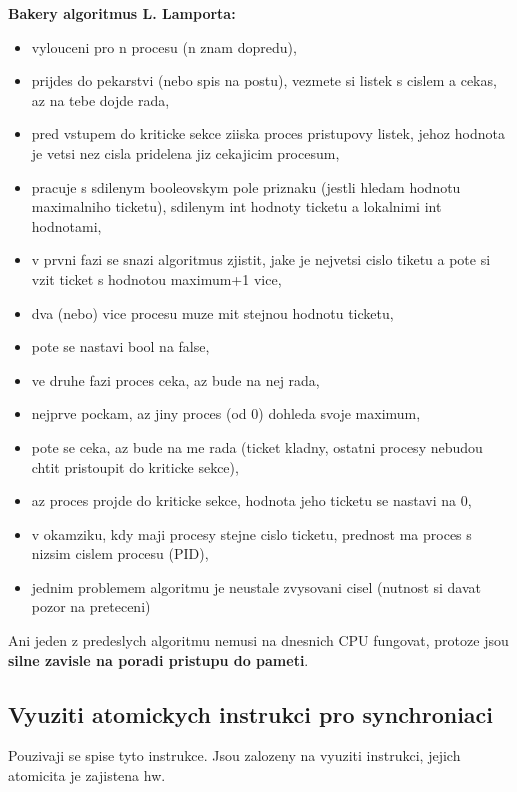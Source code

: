 \documentclass[a4paper, 11pt]{article}
\begin{document}
\textbf{Bakery algoritmus L. Lamporta:}
\begin{itemize}
    \item vylouceni pro n procesu (n znam dopredu),
    \item prijdes do pekarstvi (nebo spis na postu), vezmete si listek s cislem a cekas, az na tebe dojde rada,
    \item pred vstupem do kriticke sekce ziiska proces pristupovy listek, jehoz hodnota je vetsi nez cisla pridelena jiz cekajicim procesum,
    \item pracuje s sdilenym booleovskym pole priznaku (jestli hledam hodnotu maximalniho ticketu), sdilenym int hodnoty ticketu a lokalnimi int hodnotami,
    \item v prvni fazi se snazi algoritmus zjistit, jake je nejvetsi cislo tiketu a pote si vzit ticket s hodnotou maximum+1 vice,
    \item dva (nebo) vice procesu muze mit stejnou hodnotu ticketu,
    \item pote se nastavi bool na false,
    \item ve druhe fazi proces ceka, az bude na nej rada,
    \item nejprve pockam, az jiny proces (od 0) dohleda svoje maximum,
    \item pote se ceka, az bude na me rada (ticket kladny, ostatni procesy nebudou chtit pristoupit do kriticke sekce),
    \item az proces projde do kriticke sekce, hodnota jeho ticketu se nastavi na 0,
    \item v okamziku, kdy maji procesy stejne cislo ticketu, prednost ma proces s nizsim cislem procesu (PID),
    \item jednim problemem algoritmu je neustale zvysovani cisel (nutnost si davat pozor na preteceni) \\
\end{itemize}

Ani jeden z predeslych algoritmu nemusi na dnesnich CPU fungovat, protoze jsou \textbf{silne zavisle na poradi pristupu do pameti}. \\

\newpage

\subsection{Vyuziti atomickych instrukci pro synchroniaci}
Pouzivaji se spise tyto instrukce. Jsou zalozeny na vyuziti instrukci, jejich atomicita je zajistena hw.
\end{document}
